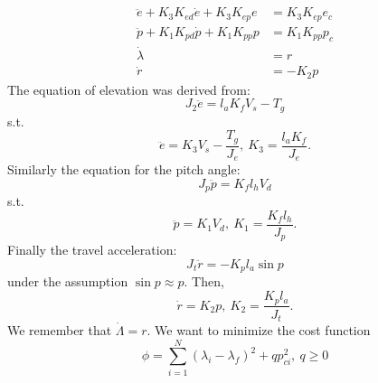 \begin{subequations}
\label{eq:model_al}
\begin{align}
	\ddot{e} + K_{3} K_{ed} \dot{e} + K_{3} K_{ep} e &= K_{3} K_{ep} e_{c} \label{eq:model_se_al_elev} \\
	\ddot{p} + K_{1} K_{pd} \dot{p} + K_{1} K_{pp} p &= K_{1} K_{pp} p_{c} \label{eq:model_se_al_pitch} \\
	\dot{\lambda} &= r \label{eq:model_se_al_lambda} \\
	\dot{r} &= -K_{2} p \label{eq:model_se_al_r} 
\end{align}
\end{subequations}
The equation of elevation was derived from: 
\begin{equation}
	J_{2} \ddot{e} = l_{a} K_{f} V_{s} - T_{g}
\end{equation}
s.t.
\begin{equation*}
\ddot{e}=K_{3} V_{s}-\frac{T_{g}}{J_{e}},\: K_{3}=\frac{l_{a}K_{f}}{J_{e}}.
\end{equation*}
Similarly the equation for the pitch angle:
\begin{equation}
	J_{p} \ddot{p} = K_{f} l_{h} V_{d} 
\end{equation}
s.t.
\begin{equation*}
\ddot{p}=K_{1} V_{d},\: K_{1}=\frac{K_{f}l_{h}}{J_{p}}.
\end{equation*}
Finally the travel acceleration: 
\begin{equation*}
	J_{t} \ddot{r} = -K_{p} l_{a} \sin p  
\end{equation*}
under the assumption $\sin p \approx p$. Then,
\begin{equation}
\dot{r}=K_{2} p,\: K_{2}=\frac{K_{p}l_{a}}{J_{t}}.
\end{equation}
We remember that $\dot{\Lambda}=r$.
We want to minimize the cost function 
\begin{equation}
\phi = \sum_{i=1}^{N}(\lambda_{i}-\lambda_{f})^2+qp_{ci}^{2},\:q\geq 0
\end{equation}
